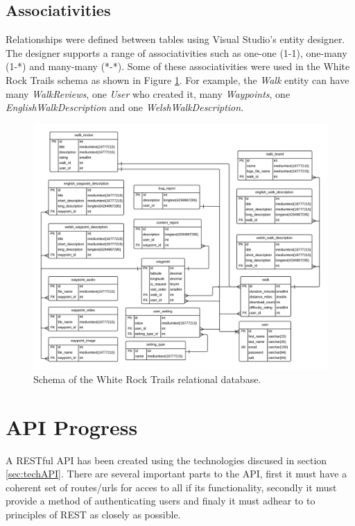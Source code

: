 \documentclass[11pt,a4paper]{article}
\begin{document}
\subsection{Associativities}

Relationships were defined between tables using Visual Studio's entity designer.
The designer supports a range of associativities such as one-one (1-1), one-many (1-*) and many-many (*-*).
Some of these associativities were used in the White Rock Trails schema as shown in Figure \ref{fig:DatabaseSchema}.
For example, the \emph{Walk} entity can have many \emph{WalkReviews}, one \emph{User} who created it, many \emph{Waypoints}, one \emph{EnglishWalkDescription} and one \emph{WelshWalkDescription}.

\begin{figure}[H]
\centering
\includegraphics[angle=90, width=1\textwidth]{./img/DatabaseSchema}
\caption{Schema of the White Rock Trails relational database.}
\label{fig:DatabaseSchema}
\end{figure}

\section{API Progress}

A RESTful API has been created using the technologies discused in section \ref{sec:techAPI}. There are several important parts to the API, first it must have a coherent set of routes/urls for acces to all if its functionality, secondly it must provide a method of authenticating users and finaly it must adhear to to principles of REST as closely as possible.
\end{document}
